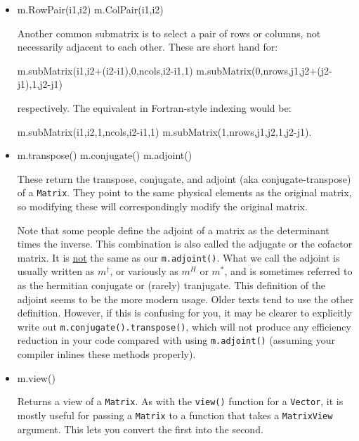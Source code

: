 \documentclass[twoside,letterpaper,11pt]{article}
\renewcommand{\tt}[1]{{\lstinline {#1}}}
\begin{document}
\begin{itemize}
\item
\begin{tmvcode}
m.RowPair(i1,i2)
m.ColPair(i1,i2)
\end{tmvcode}
Another common submatrix is to select a pair of rows or columns, not 
necessarily adjacent to each other.  These are short hand for:
\begin{tmvcode}
m.subMatrix(i1,i2+(i2-i1),0,ncols,i2-i1,1)
m.subMatrix(0,nrows,j1,j2+(j2-j1),1,j2-j1)
\end{tmvcode}
respectively.  The equivalent in Fortran-style indexing would be:
\begin{tmvcode}
m.subMatrix(i1,i2,1,ncols,i2-i1,1)
m.subMatrix(1,nrows,j1,j2,1,j2-j1).
\end{tmvcode}

\item
\begin{tmvcode}
m.transpose()
m.conjugate()
m.adjoint()
\end{tmvcode}
These return the transpose, conjugate, and adjoint (aka conjugate-transpose) 
of a \tt{Matrix}.  They point to the 
same physical elements as the original matrix, so modifying these will
correspondingly modify the original matrix.

Note that some people define the adjoint of a matrix as the determinant times
the inverse.  This combination is also called the adjugate or the cofactor matrix.
It is \underline{not} the same as our \tt{m.adjoint()}.  What we call the adjoint 
is usually written as $m^\dagger$, or variously as $m^H$ or $m^*$, 
and is sometimes referred to as the hermitian conjugate
or (rarely) tranjugate.  This definition of the adjoint seems to be the more modern
usage.  Older texts tend to use the other definition.  However, if this is confusing
for you, it may be clearer to explicitly write out \tt{m.conjugate().transpose()},
which will not produce any efficiency reduction in your code compared with using
\tt{m.adjoint()} (assuming your compiler inlines these methods properly).

\item
\begin{tmvcode}
m.view()
\end{tmvcode}
Returns a view of a \tt{Matrix}.  As with the \tt{view()} function for a \tt{Vector}, it is mostly
useful for passing a \tt{Matrix} to a function that takes a \tt{MatrixView} argument.  
This lets you convert the first into the second.


\end{itemize}
\end{document}
